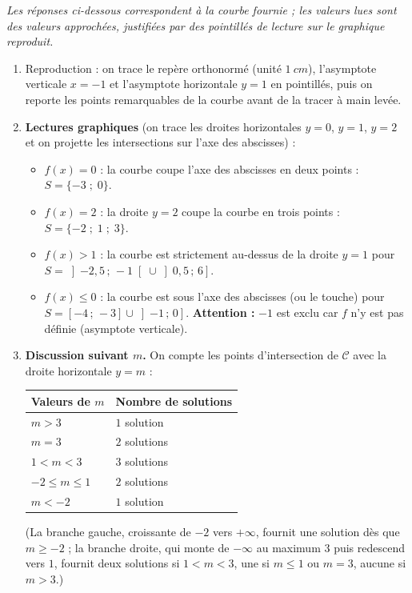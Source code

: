 \documentclass[11pt]{article}
\begin{document}
\begin{corrige}
\emph{Les réponses ci-dessous correspondent à la courbe fournie ; les valeurs lues sont des valeurs approchées, justifiées par des pointillés de lecture sur le graphique reproduit.}
\begin{enumerate}
\item Reproduction : on trace le repère orthonormé (unité $\SI{1}{cm}$), l'asymptote verticale $x=-1$ et l'asymptote horizontale $y=1$ en pointillés, puis on reporte les points remarquables de la courbe avant de la tracer à main levée.
\item \textbf{Lectures graphiques} (on trace les droites horizontales $y=0$, $y=1$, $y=2$ et on projette les intersections sur l'axe des abscisses) :
\begin{itemize}
\item[a)] $f(x)=0$ : la courbe coupe l'axe des abscisses en deux points : $S=\{-3\;;\;0\}$.
\item[b)] $f(x)=2$ : la droite $y=2$ coupe la courbe en trois points : $S=\{-2\;;\;1\;;\;3\}$.
\item[c)] $f(x)>1$ : la courbe est strictement au-dessus de la droite $y=1$ pour $S=\left]-2{,}5\,;\,-1\right[\cup\left]0{,}5\,;\,6\right]$.
\item[d)] $f(x)\leq 0$ : la courbe est sous l'axe des abscisses (ou le touche) pour $S=[-4\,;\,-3]\cup\left]-1\,;\,0\right]$. \textbf{Attention :} $-1$ est exclu car $f$ n'y est pas définie (asymptote verticale).
\end{itemize}
\item \textbf{Discussion suivant $m$.} On compte les points d'intersection de $\mathscr{C}$ avec la droite horizontale $y=m$ :
\begin{center}
\begin{tabularx}{\linewidth}{|l|X|}\hline
\rowcolor{popblueL} Valeurs de $m$ & Nombre de solutions \\ \hline
$m>3$ & $1$ solution \\ \hline
$m=3$ & $2$ solutions \\ \hline
$1<m<3$ & $3$ solutions \\ \hline
$-2\leq m\leq 1$ & $2$ solutions \\ \hline
$m<-2$ & $1$ solution \\ \hline
\end{tabularx}
\end{center}
(La branche gauche, croissante de $-2$ vers $+\infty$, fournit une solution dès que $m\geq -2$ ; la branche droite, qui monte de $-\infty$ au maximum $3$ puis redescend vers $1$, fournit deux solutions si $1<m<3$, une si $m\leq 1$ ou $m=3$, aucune si $m>3$.)
\end{enumerate}
\end{corrige}
\end{document}
